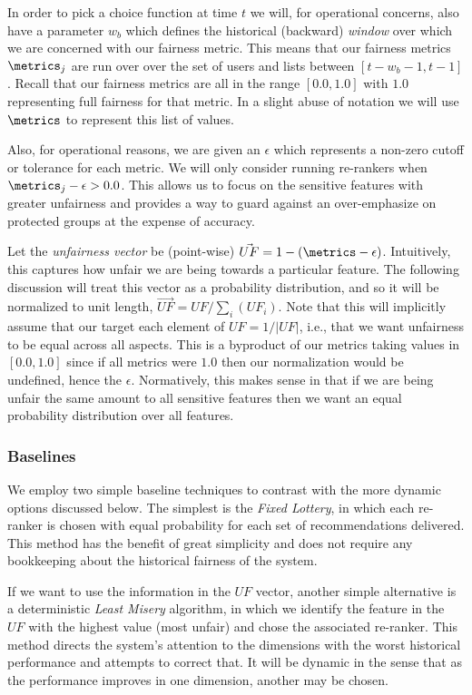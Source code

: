 In order to pick a choice function at time $t$ we will, for operational concerns, also have a parameter $w_b$ which defines the historical (backward) \emph{window} over which we are concerned with our fairness metric.  This means that our fairness metrics $\metrics_j$ are run over over the set of users and lists between $[t - w_b - 1, t-1]$.  Recall that our fairness metrics are all in the range $[0.0, 1.0]$ with $1.0$ representing full fairness for that metric.  In a slight abuse of notation we will use $\metrics$ to represent this list of values.

Also, for operational reasons, we are given an $\epsilon$ which represents a non-zero cutoff or tolerance for each metric.  We will only consider running re-rankers when $\metrics_j - \epsilon > 0.0$. This allows us to focus on the sensitive features with greater unfairness and provides a way to guard against an over-emphasize on protected groups at the expense of accuracy.

Let the \emph{unfairness vector} be (point-wise) $\vec{UF} = 1 - (\metrics - \epsilon)$.  Intuitively, this captures how unfair we are being towards a particular feature.  The following discussion will treat this vector as a probability distribution, and so it will be normalized to unit length, $\vec{UF} = UF / \sum_i(UF_i)$.   Note that this will implicitly assume that our target each element of $UF = 1/|UF|$, i.e., that we want unfairness to be equal across all aspects.  This is a byproduct of our metrics taking values in $[0.0,1.0]$ since if all metrics were $1.0$ then our normalization would be undefined, hence the $\epsilon$.  Normatively, this makes sense in that if we are being unfair the same amount to all sensitive features then we want an equal probability distribution over all features.

\subsubsection{\textbf{Baselines}}\label{sec:static}
\hfill

We employ two simple baseline techniques to contrast with the more dynamic options discussed below. The simplest is the \textit{Fixed Lottery}, in which each re-ranker is chosen with equal probability for each set of recommendations delivered. This method has the benefit of great simplicity and does not require any bookkeeping about the historical fairness of the system. 

If we want to use the information in the $UF$ vector, another simple alternative is a deterministic \textit{Least Misery} algorithm, in which we identify the feature in the $UF$ with the highest value (most unfair) and chose the associated re-ranker. This method directs the system's attention to the dimensions with the worst historical performance and attempts to correct that. It will be dynamic in the sense that as the performance improves in one dimension, another may be chosen. 

